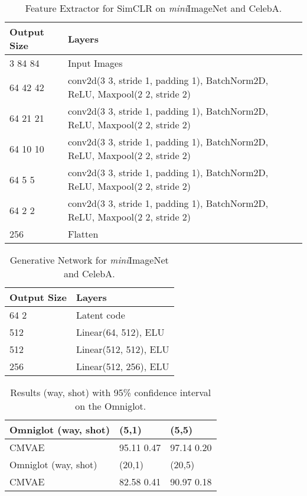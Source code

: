 \documentclass[letterpaper]{article} \usepackage{aaai23}  \usepackage{times}  \usepackage{helvet}  \usepackage{courier}  \usepackage[hyphens]{url}  \usepackage{graphicx} \urlstyle{rm} \def\UrlFont{\rm}  \usepackage{natbib}  \usepackage{caption} \frenchspacing  \setlength{\pdfpagewidth}{8.5in}  \setlength{\pdfpageheight}{11in}  \usepackage{algorithm}
\theoremstyle{plain}
\theoremstyle{definition}
\theoremstyle{remark}
\begin{document}
\begin{table*}[]
	\centering
	\caption{Feature Extractor for SimCLR on \textit{mini}ImageNet and CelebA.}  
	\label{tab:app_simclr}
	\begin{tabular}{ll}
		\toprule
		Output Size                 & Layers                                                                                           \\ \midrule
		3  84  84   & Input Images                                                                                     \\
		64   42  42 & conv2d(3  3, stride 1, padding 1), BatchNorm2D, ReLU, Maxpool(2  2, stride 2)    \\
		64  21  21    & conv2d(3  3, stride 1, padding 1), BatchNorm2D, ReLU, Maxpool(2  2, stride 2)    \\
		64  10  10    & conv2d(3  3, stride 1, padding 1), BatchNorm2D, ReLU, Maxpool(2  2, stride 2)    \\
		64  5  5    & conv2d(3  3, stride 1, padding 1), BatchNorm2D, ReLU, Maxpool(2  2, stride 2)    \\
		64  2  2    & conv2d(3  3, stride 1, padding 1), BatchNorm2D, ReLU, Maxpool(2  2, stride 2)    \\
		256                         & Flatten                                                                                          \\ \bottomrule
	\end{tabular}
\end{table*}
\begin{table}[]
	\centering
	\caption{Generative Network   for \textit{mini}ImageNet and CelebA.}  
	\label{tab:app_gen_mini}
	\begin{tabular}{ll}
		\toprule
		Output Size                 & Layers                                                                                           \\ \midrule
		64  2  & Latent code \\
		512 &Linear(64, 512), ELU\\
		512 &Linear(512, 512), ELU\\
		256 &Linear(512, 256), ELU\\  \bottomrule
	\end{tabular}
\end{table}
\begin{table}[t]
	\centering
	\caption{Results (way, shot) with 95\% confidence interval on the Omniglot.}  
	\label{tab:app_res_omn}
	\begin{tabular}{lll}
		\toprule
		Omniglot (way, shot) & (5,1)             & (5,5)              \\ \hline
		\rowcolor{gray!20}  CMVAE    & 95.11  0.47  & 97.14  0.20   \\ \hline
		Omniglot (way, shot) & (20,1)            & (20,5)             \\ \hline
		\rowcolor{gray!20}  CMVAE    & 82.58   0.41 & 90.97    0.18 \\ \bottomrule
	\end{tabular}
	
\end{table}
\end{document}
